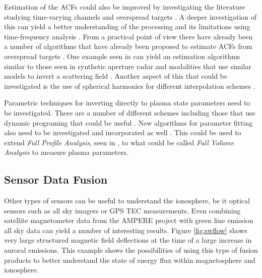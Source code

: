 Estimation of the ACFs could also be improved by investigating the literature studying time-varying channels and overspread targets \citep{Kailath:1962jx,Kailath:1963gh,Pfander:2006hh,Pfander:2015ea}. A deeper investigation of this can yield a better understanding of the processing and its limitations using time-frequency analysis \citep{TFAcohen,Peyrin:1986bh,Jiang:kj}. From a practical point of view there have already been a number of algorithms that have already been proposed to estimate ACFs from overspread targets \citep{Pfander:2015ea,Jiang:kj}. One example seen in \citet{Kay:2003jl} can yield an estimation algorithms similar to those seen in synthetic aperture radar and modalities that use similar models to invert a scattering field \citep{1456966,Ralston:2007hs,richards2014fundamentals}. Another aspect of this that could be investigated is the use of spherical harmonics for different interpolation schemes \citep{Baddour:2010cq,Baddour:2009jm,Baddour:2012bd}.

Parametric techniques for inverting directly to plasma state parameters need to be investigated. There are a number of different schemes including those that use dynamic programing that could be useful \citep{Yau:1992kd,Yau:1993kf,Oktem:2014ju}. New algorithms for parameter fitting also need to be investigated and incorporated as well \citep{Shpynev:2010co}. This could be used to extend \textit{Full Profile Analysis}, seen in \citet{RDS:RDS3308,hysell2008}, to what could be called \textit{Full Volume Analysis} to measure plasma parameters.

\subsection{Sensor Data Fusion}

Other types of sensors can be useful to understand the ionosphere, be it optical sensors such as all sky imagers or GPS TEC measurements. Even combining satellite magnetometer data from the AMPERE project \citep{Anderson:2000uh,Anderson:2014hf} with green line emission all sky data can yield a number of interesting results. Figure \ref{fig:swflow} shows very large structured magnetic field deflections at the time of a large increase in auroral emissions. This example shows the possibilities of using this type of fusion products to better understand the state of energy flux within magnetosphere and ionosphere.

